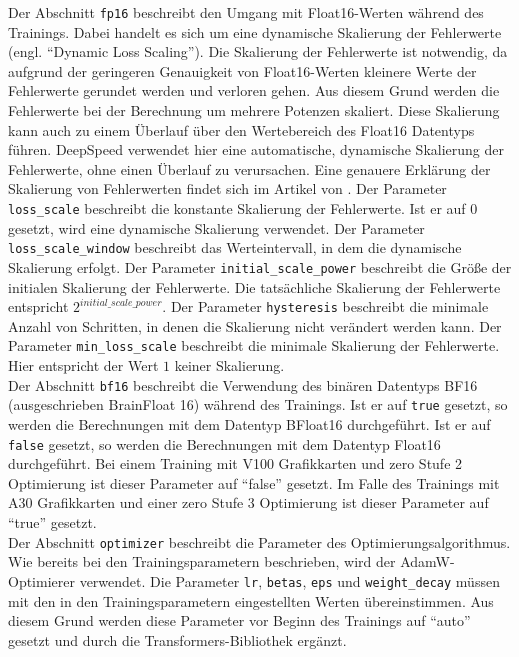 Der Abschnitt \texttt{fp16} beschreibt den Umgang mit Float16-Werten während des Trainings.
Dabei handelt es sich um eine dynamische Skalierung der Fehlerwerte (engl. \enquote{Dynamic Loss Scaling}).
Die Skalierung der Fehlerwerte ist notwendig, da aufgrund der geringeren Genauigkeit von Float16-Werten kleinere Werte der Fehlerwerte gerundet werden und verloren gehen.
Aus diesem Grund werden die Fehlerwerte bei der Berechnung um mehrere Potenzen skaliert.
Diese Skalierung kann auch zu einem Überlauf über den Wertebereich des Float16 Datentyps führen.
DeepSpeed verwendet hier eine automatische, dynamische Skalierung der Fehlerwerte, ohne einen Überlauf zu verursachen.
Eine genauere Erklärung der Skalierung von Fehlerwerten findet sich im Artikel von \citet{lossscale}.
Der Parameter \texttt{loss\_scale} beschreibt die konstante Skalierung der Fehlerwerte.
Ist er auf $0$ gesetzt, wird eine dynamische Skalierung verwendet.
Der Parameter \texttt{loss\_scale\_window} beschreibt das Werteintervall, in dem die dynamische Skalierung erfolgt.
Der Parameter \texttt{initial\_scale\_power} beschreibt die Größe der initialen Skalierung der Fehlerwerte.
Die tatsächliche Skalierung der Fehlerwerte entspricht $2^{initial\_scale\_power}$.
Der Parameter \texttt{hysteresis} beschreibt die minimale Anzahl von Schritten, in denen die Skalierung nicht verändert werden kann.
Der Parameter \texttt{min\_loss\_scale} beschreibt die minimale Skalierung der Fehlerwerte.
Hier entspricht der Wert $1$ keiner Skalierung.\\

Der Abschnitt \texttt{bf16} beschreibt die Verwendung des binären Datentyps BF16 (ausgeschrieben BrainFloat 16) während des Trainings.
Ist er auf \texttt{true} gesetzt, so werden die Berechnungen mit dem Datentyp BFloat16 durchgeführt.
Ist er auf \texttt{false} gesetzt, so werden die Berechnungen mit dem Datentyp Float16 durchgeführt.
Bei einem Training mit V100 Grafikkarten und \ac{zero} Stufe 2 Optimierung ist dieser Parameter auf \enquote{false} gesetzt.
Im Falle des Trainings mit A30 Grafikkarten und einer \ac{zero} Stufe 3 Optimierung ist dieser Parameter auf \enquote{true} gesetzt.\\

Der Abschnitt \texttt{optimizer} beschreibt die Parameter des Optimierungsalgorithmus. Wie bereits bei den Trainingsparametern beschrieben, wird der AdamW-Optimierer verwendet.
Die Parameter \texttt{lr}, \texttt{betas}, \texttt{eps} und \texttt{weight\_decay} müssen mit den in den Trainingsparametern eingestellten Werten übereinstimmen.
Aus diesem Grund werden diese Parameter vor Beginn des Trainings auf \enquote{auto} gesetzt und durch die Transformers-Bibliothek ergänzt.\\

